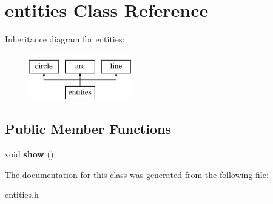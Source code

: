 \hypertarget{classentities}{\section{entities Class Reference}
\label{classentities}
}
Inheritance diagram for entities\-:\begin{figure}[H]
\begin{center}
\leavevmode
\includegraphics[height=2.000000cm]{classentities}
\end{center}
\end{figure}
\subsection*{Public Member Functions}
\begin{DoxyCompactItemize}
\item 
\hypertarget{classentities_ae7df80d4007a075181244f8c2f2dd6f6}{void {\bfseries show} ()}\label{classentities_ae7df80d4007a075181244f8c2f2dd6f6}

\end{DoxyCompactItemize}


The documentation for this class was generated from the following file\-:\begin{DoxyCompactItemize}
\item 
\hyperlink{entities_8h}{entities.\-h}\end{DoxyCompactItemize}
